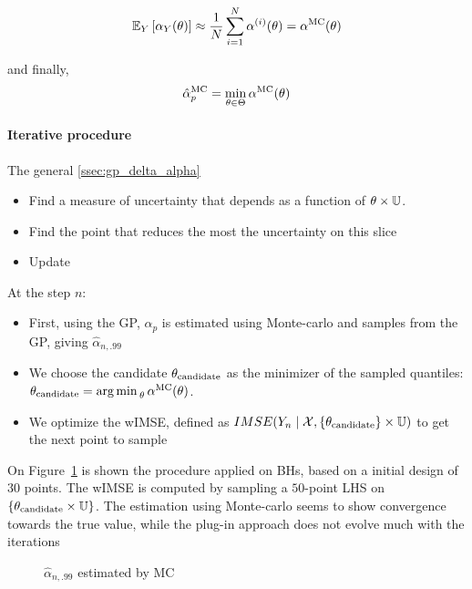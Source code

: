 \documentclass[../../Main_ManuscritThese.tex]{subfiles}
\newcommand{\IMSE}{\mathop{IMSE}}
\begin{document}
\begin{equation}
 \mathbb{E}_{Y}\left[\alpha_{Y}(\theta) \right] \approx \frac{1}{N} \sum_{i=1}^N \alpha^{(i)}(\theta) = \alpha^{\mathrm{MC}}(\theta)
\end{equation}

and finally,
\begin{equation}
  \hat{\alpha}_p^{\mathrm{MC}} = \min_{\theta \in \Theta} \alpha^{\mathrm{MC}}(\theta)
\end{equation}


\paragraph{Iterative procedure}
The general
\cref{ssec:gp_delta_alpha}
\begin{itemize}
\item Find a measure of uncertainty that depends as a function of $\theta \times \mathbb{U}$.
\item Find the point that reduces the most the uncertainty on this slice
\item Update
\end{itemize}

At the step $n$:
\begin{itemize}
\item First, using the GP, $\alpha_p$ is estimated using Monte-carlo and samples from the GP, giving $\hat{\alpha}_{n,.99}$
\item We choose the candidate $\theta_{\mathrm{candidate}}$ as the minimizer of the sampled quantiles: $\theta_{\mathrm{candidate}} = \operatorname*{arg\,min \,}_{\theta} \alpha^{\mathrm{MC}}(\theta)$.
\item We optimize the wIMSE, defined as $\IMSE(Y_n \mid \mathcal{X}, \{\kk_{\mathrm{candidate}}\}\times \Uspace )$ to get the next point to sample
\end{itemize}
On Figure~\cref{fig:alpha_MC} is shown the procedure applied on BHs, based on a initial design of $30$ points. The wIMSE is computed by sampling a $50$-point LHS on $\{\theta_{\mathrm{candidate}} \times \mathbb{U}\}$.
The estimation using Monte-carlo seems to show convergence towards the true value, while the plug-in approach does not evolve much with the iterations
\begin{figure}[!h]
  \centering
  
  \label{fig:alpha_MC}
  \caption{$\hat{\alpha}_{n,.99}$ estimated by MC }
\end{figure}

%   
\end{document}
